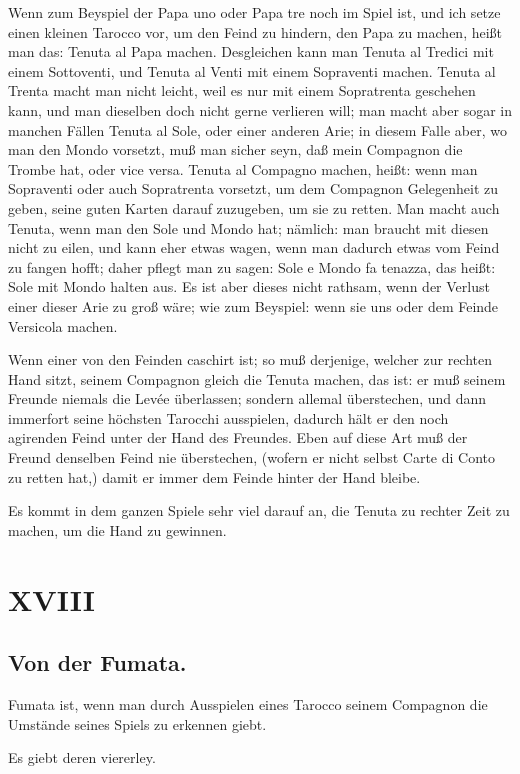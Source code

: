 \documentclass[11pt,a6paper,twoside]{article}
\begin{document}
Wenn zum Beyspiel der Papa uno oder Papa tre noch im Spiel ist, und ich setze einen kleinen Tarocco vor, um den Feind zu hindern, den Papa zu machen, heißt man das: Tenuta al Papa machen. Desgleichen kann man Tenuta al Tredici mit einem Sottoventi, und Tenuta al Venti mit einem Sopraventi machen. Tenuta al Trenta macht man nicht leicht, weil es nur mit einem Sopratrenta geschehen kann, und man dieselben doch nicht gerne verlieren will; man macht aber sogar in manchen Fällen Tenuta al Sole, oder einer anderen Arie; in diesem Falle aber, wo man den Mondo vorsetzt, muß man sicher seyn, daß mein Compagnon die Trombe hat, oder vice versa. Tenuta al Compagno machen, heißt: wenn man Sopraventi oder auch Sopratrenta vorsetzt, um dem Compagnon Gelegenheit zu geben, seine guten Karten darauf zuzugeben, um sie zu retten. Man macht auch Tenuta, wenn man den Sole und Mondo hat; nämlich: man braucht mit diesen nicht zu eilen, und kann eher etwas wagen, wenn man dadurch etwas vom Feind zu fangen hofft; daher pflegt man zu sagen: Sole e Mondo fa tenazza, das heißt: Sole mit Mondo halten aus. Es ist aber dieses nicht rathsam, wenn der Verlust einer dieser Arie zu groß wäre; wie zum Beyspiel: wenn sie uns oder dem Feinde Versicola machen.

Wenn einer von den Feinden caschirt ist; so muß derjenige, welcher zur rechten Hand sitzt, seinem Compagnon gleich die Tenuta machen, das ist: er muß seinem Freunde niemals die Levée überlassen; sondern allemal überstechen, und dann immerfort seine höchsten Tarocchi ausspielen, dadurch hält er den noch agirenden Feind unter der Hand des Freundes. Eben auf diese Art muß der Freund denselben Feind nie überstechen, (wofern er nicht selbst Carte di Conto zu retten hat,) damit er immer dem Feinde hinter der Hand bleibe.

Es kommt in dem ganzen Spiele sehr viel darauf an, die Tenuta zu rechter Zeit zu machen, um die Hand zu gewinnen.

\section{XVIII}
\subsection{Von der Fumata.}

Fumata ist, wenn man durch Ausspielen eines Tarocco seinem Compagnon die Umstände seines Spiels zu erkennen giebt.

Es giebt deren viererley.
\end{document}
